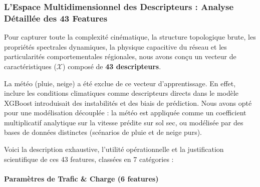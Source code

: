 \documentclass[10pt, a4paper]{article}
\begin{document}
\subsubsection{L'Espace Multidimensionnel des Descripteurs : Analyse
Détaillée des 43
Features}\label{lespace-multidimensionnel-des-descripteurs-analyse-duxe9tailluxe9e-des-43-features}

Pour capturer toute la complexité cinématique, la structure topologique
brute, les propriétés spectrales dynamiques, la physique capacitive du
réseau et les particularités comportementales régionales, nous avons
conçu un vecteur de caractéristiques (\(\mathcal{X}\)) composé de
\textbf{43 descripteurs}.

La météo (pluie, neige) a été exclue de ce vecteur d'apprentissage. En
effet, inclure les conditions climatiques comme descripteurs directs
dans le modèle XGBoost introduisait des instabilités et des biais de
prédiction. Nous avons opté pour une modélisation découplée : la météo
est appliquée comme un coefficient multiplicatif analytique sur la
vitesse prédite sur sol sec, ou modélisée par des bases de données
distinctes (scénarios de pluie et de neige purs).

Voici la description exhaustive, l'utilité opérationnelle et la
justification scientifique de ces 43 features, classées en 7 catégories
:

\paragraph{Paramètres de Trafic \& Charge (6
features)}\label{paramuxe8tres-de-trafic-charge-6-features}
\end{document}
